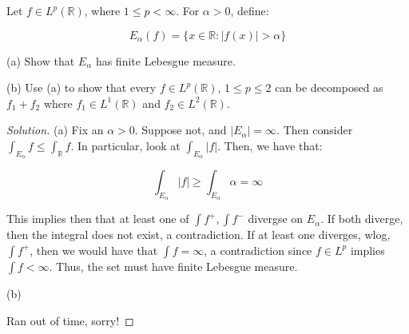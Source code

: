 \documentclass[10pt]{article}
\newenvironment{problem}[2][Problem]{\begin{trivlist}
\item[\hskip \labelsep {\bfseries #1}\hskip \labelsep {\bfseries #2.}]}{\end{trivlist}}
\begin{document}
\begin{problem}{5}

Let $f \in L^p(\mathbb{R})$, where $1 \leq p < \infty$. For $\alpha > 0$, define:

$$ E_\alpha(f) = \{ x \in \mathbb{R} : |f(x)| > \alpha \} $$

(a) Show that $E_\alpha$ has finite Lebesgue measure.

(b) Use (a) to show that every $f \in L^p(\mathbb{R})$, $1 \leq p \leq 2$ can be decomposed as $f_1 + f_2$ where $f_1 \in L^1(\mathbb{R})$ and $f_2 \in L^2(\mathbb{R})$.

\end{problem}
\begin{proof}[Solution]

(a) Fix an $\alpha > 0$. Suppose not, and $|E_\alpha| = \infty$. Then consider $\int_{E_\alpha} f \leq \int_{\mathbb{R}} f$. In particular, look at $\int_{E_\alpha} |f|$. Then, we have that:

$$ \int_{E_\alpha} |f| \geq \int_{E_\alpha} \alpha = \infty$$

This implies then that at least one of $\int f^+, \int f^-$ divergse on $E_\alpha$. If both diverge, then the integral does not exist, a contradiction. If at least one diverges, wlog, $\int f^+$, then we would have that $\int f  = \infty$, a contradiction since $f \in L^p$ implies $\int f < \infty$. Thus, the set must have finite Lebesgue measure.

(b)

Ran out of time, sorry!


\end{proof}


 
\end{document}
